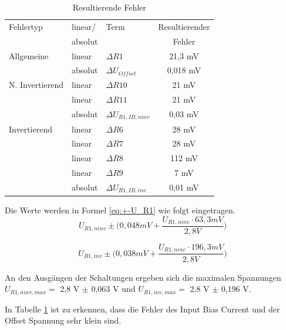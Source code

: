 \begin{table}[!h]
	\centering
	\caption{Resultierende Fehler}
	\label{tab:Fehler_Beispiel}
	\normalsize
	\begin{tabular}{l|l|l|c}
		Fehlertyp & linear/ & Term &  Resultierender  \\
				  & absolut && Fehler\\
		\hline
	 	Allgemeine 		& linear 	& $\Delta R1$  				& 21,3 mV \\
						& absolut	& $\Delta U_{Offset}$		& 0,018 mV \\
		\hline
		N. Invertierend & linear 	& $\Delta R10$ 				& 21 mV \\
						& linear 	& $\Delta R11$ 				& 21 mV\\
						& absolut	& $\Delta U_{R1,IB,ninv}$	& 0,03 mV \\
		\hline
		Invertierend 	& linear 	& $\Delta R6$ 				& 28 mV\\
						& linear 	& $\Delta R7$ 				& 28 mV \\
						& linear	& $\Delta R8$ 				& 112 mV\\
						& linear	& $\Delta R9$ 				& 7 mV \\
						& absolut	& $\Delta U_{R1,IB,inv}$	& 0,01 mV \\
		
	\end{tabular}
\end{table}

Die Werte werden in Formel \ref{eq:+-U_R1} wie folgt eingetragen.
\begin{equation}
		U_{R1,ninv} \pm \bigg(0,048 mV
		+ \frac{U_{R1,ninv} \cdot 63,3mV}{2,8V}  \bigg)
\end{equation}

\begin{equation}
	U_{R1,inv} \pm \bigg(0,038 mV
	+ \frac{U_{R1,ninv} \cdot 196,3mV}{2,8V}  \bigg)
\end{equation}

An den Ausgängen der Schaltungen ergeben sich die maximalen Spannungen $U_{R1,ninv,max} = $ 2,8 V $\pm$ 0,063 V und 
$U_{R1,inv,max} = $ 2,8 V $\pm$ 0,196 V. 

In Tabelle \ref{tab:Fehler_Beispiel} ist zu erkennen, dass die Fehler des Input Bias Current und der Offset Spannung sehr klein sind.